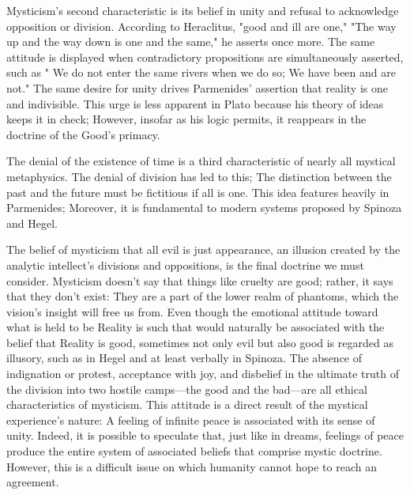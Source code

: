 \documentclass[a4paper,12pt]{book}[2004/02/16]
\theoremstyle{ilemma}
\theoremstyle{itheorem}
\theoremstyle{iother}
\theoremstyle{icorollary}
\theoremstyle{numcorollary}
\theoremstyle{idefinition}
\begin{document}
Mysticism's second characteristic is its belief in unity and refusal to acknowledge opposition or division. According to Heraclitus, "good and ill are one," "The way up and the way down is one and the same," he asserts once more. The same attitude is displayed when contradictory propositions are simultaneously asserted, such as " We do not enter the same rivers when we do so; We have been and are not." The same desire for unity drives Parmenides' assertion that reality is one and indivisible. This urge is less apparent in Plato because his theory of ideas keeps it in check; However, insofar as his logic permits, it reappears in the doctrine of the Good's primacy.

The denial of the existence of time is a third characteristic of nearly all mystical metaphysics. The denial of division has led to this; The distinction between the past and the future must be fictitious if all is one. This idea features heavily in Parmenides; Moreover, it is fundamental to modern systems proposed by Spinoza and Hegel.

The belief of mysticism that all evil is just appearance, an illusion created by the analytic intellect's divisions and oppositions, is the final doctrine we must consider. Mysticism doesn't say that things like cruelty are good; rather, it says that they don't exist: They are a part of the lower realm of phantoms, which the vision's insight will free us from. Even though the emotional attitude toward what is held to be Reality is such that would naturally be associated with the belief that Reality is good, sometimes not only evil but also good is regarded as illusory, such as in Hegel and at least verbally in Spinoza. The absence of indignation or protest, acceptance with joy, and disbelief in the ultimate truth of the division into two hostile camps—the good and the bad—are all ethical characteristics of mysticism. This attitude is a direct result of the mystical experience's nature: A feeling of infinite peace is associated with its sense of unity. Indeed, it is possible to speculate that, just like in dreams, feelings of peace produce the entire system of associated beliefs that comprise mystic doctrine. However, this is a difficult issue on which humanity cannot hope to reach an agreement.
\end{document}
